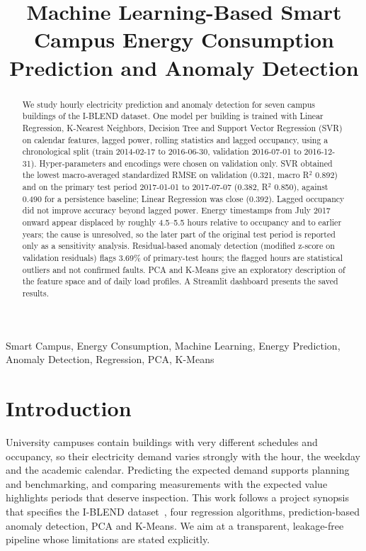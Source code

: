 \documentclass[conference]{IEEEtran}
\begin{document}
\title{Machine Learning-Based Smart Campus Energy Consumption Prediction and Anomaly Detection}
\author{
}
\maketitle

\begin{abstract}
We study hourly electricity prediction and anomaly detection for seven campus buildings of the I-BLEND dataset. One model per building
is trained with Linear Regression, K-Nearest Neighbors, Decision Tree and Support Vector Regression (SVR) on calendar features, lagged power,
rolling statistics and lagged occupancy, using a chronological split (train 2014-02-17 to 2016-06-30, validation 2016-07-01 to 2016-12-31).
Hyper-parameters and encodings were chosen on validation only. SVR obtained the lowest macro-averaged standardized RMSE on validation (0.321,
macro R$^2$ 0.892) and on the primary test period 2017-01-01 to 2017-07-07 (0.382, R$^2$ 0.850), against 0.490 for a persistence baseline;
Linear Regression was close (0.392). Lagged occupancy did not improve accuracy beyond lagged power. Energy timestamps from July 2017 onward appear
displaced by roughly 4.5--5.5 hours relative to occupancy and to earlier years; the cause is unresolved, so the later part of the original test period is
reported only as a sensitivity analysis. Residual-based anomaly detection (modified z-score on validation residuals) flags 3.69\% of primary-test hours;
the flagged hours are statistical outliers and not confirmed faults. PCA and K-Means give an exploratory description of the feature space and of daily load profiles.
A Streamlit dashboard presents the saved results.
\end{abstract}
\begin{IEEEkeywords}
Smart Campus, Energy Consumption, Machine Learning, Energy Prediction, Anomaly Detection, Regression, PCA, K-Means
\end{IEEEkeywords}

\section{Introduction}
University campuses contain buildings with very different schedules and occupancy, so their electricity demand varies strongly with the hour, the weekday
and the academic calendar. Predicting the expected demand supports planning and benchmarking, and comparing measurements with the expected value highlights periods
that deserve inspection. This work follows a project synopsis that specifies the I-BLEND dataset~\cite{rashid2019iblend}, four regression algorithms, prediction-based
anomaly detection, PCA and K-Means. We aim at a transparent, leakage-free pipeline whose limitations are stated explicitly.
\end{document}
